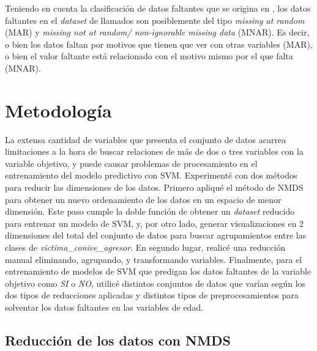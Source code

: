 \documentclass[10 pt]{article}
\begin{document}
Teniendo en cuenta la clasificación de datos faltantes que se origina en \citet{rubin1976inference}, los datos faltantes en el \textit{dataset} de llamados son posiblemente del tipo \textit{missing at random} (MAR) y \textit{missing not at random/ non-ignorable missing data} (MNAR). Es decir, o bien los datos faltan por motivos que tienen que ver con otras variables (MAR), o bien el valor faltante está relacionado con el motivo mismo por el que falta (MNAR).    


\section{Metodología}\label{met}

La extensa cantidad de variables que presenta el conjunto de datos acarrea limitaciones a la hora de buscar relaciones de más de dos o tres variables con la variable objetivo, y puede causar problemas de procesamiento en el entrenamiento del modelo predictivo con SVM. Experimenté con dos métodos para reducir las dimensiones de los datos. Primero apliqué el método de NMDS para obtener un nuevo ordenamiento de los datos en un espacio de menor dimensión. Este paso cumple la doble función de obtener un \textit{dataset} reducido para entrenar un modelo de SVM, y, por otro lado, generar visualizaciones en 2 dimensiones del total del conjunto de datos para buscar agrupamientos entre las clases de \textit{victima\_conive\_agresor}. En segundo lugar, realicé una reducción manual eliminando, agrupando, y transformando variables. Finalmente, para el entrenamiento de modelos de SVM que predigan los datos faltantes de la variable objetivo como \textit{SI} o \textit{NO}, utilicé distintos conjuntos de datos que varían según los dos tipos de reducciones aplicadas y distintos tipos de preprocesamientos para solventar los datos faltantes en las variables de edad.


\subsection{Reducción de los datos con NMDS}
\end{document}
